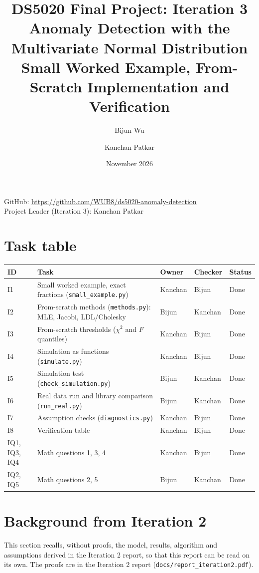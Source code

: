 \documentclass[11pt]{article}
\title{DS5020 Final Project: Iteration 3\\[4pt]
\large Anomaly Detection with the Multivariate Normal Distribution\\
Small Worked Example, From-Scratch Implementation and Verification}
\author{Bijun Wu \and Kanchan Patkar}
\date{November 2026}
\theoremstyle{definition}
\begin{document}
\maketitle

\begin{center}
GitHub: \url{https://github.com/WUB8/ds5020-anomaly-detection}\\[2pt]
Project Leader (Iteration 3): Kanchan Patkar
\end{center}

\section{Task table}
\begin{center}
\begin{tabular}{@{}lp{8.6cm}lll@{}}
\toprule
ID & Task & Owner & Checker & Status \\
\midrule
I1 & Small worked example, exact fractions (\texttt{small\_example.py}) & Kanchan & Bijun & Done \\
I2 & From-scratch methods (\texttt{methods.py}): MLE, Jacobi, LDL/Cholesky & Bijun & Kanchan & Done \\
I3 & From-scratch thresholds ($\chi^2$ and $F$ quantiles) & Kanchan & Bijun & Done \\
I4 & Simulation as functions (\texttt{simulate.py}) & Kanchan & Bijun & Done \\
I5 & Simulation test (\texttt{check\_simulation.py}) & Bijun & Kanchan & Done \\
I6 & Real data run and library comparison (\texttt{run\_real.py}) & Bijun & Kanchan & Done \\
I7 & Assumption checks (\texttt{diagnostics.py}) & Kanchan & Bijun & Done \\
I8 & Verification table & Kanchan & Bijun & Done \\
IQ1, IQ3, IQ4 & Math questions 1, 3, 4 & Kanchan & Bijun & Done \\
IQ2, IQ5 & Math questions 2, 5 & Bijun & Kanchan & Done \\
\bottomrule
\end{tabular}
\end{center}

\section{Background from Iteration 2}\label{sec:background}
This section recalls, without proofs, the model, results, algorithm and assumptions derived in the Iteration 2 report, so that this report can be read on its own. The proofs are in the Iteration 2 report (\texttt{docs/report\_iteration2.pdf}).
\end{document}
